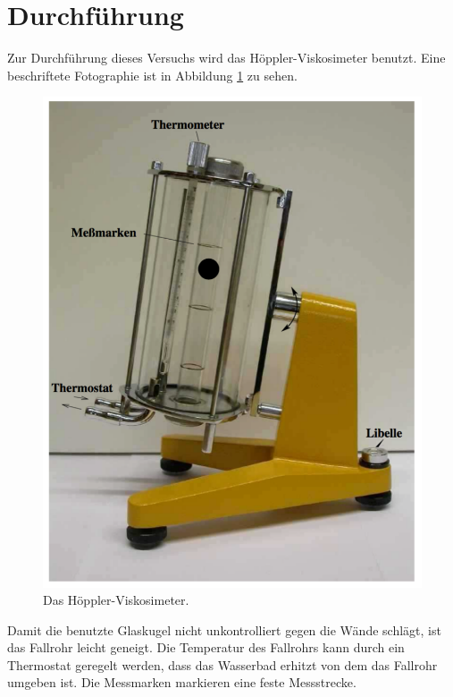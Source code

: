  \section{Durchführung}
\label{sec:Durchführung}

Zur Durchführung dieses Versuchs wird das Höppler-Viskosimeter benutzt.
Eine beschriftete Fotographie ist in Abbildung \ref{fig:hoeppvisko}
zu sehen.

\begin{figure}[h]
  \centering
  \includegraphics[height = 10 cm]{hoepplervisko.pdf}
  \caption{Das Höppler-Viskosimeter\cite{anleitung}.}
  \label{fig:hoeppvisko}
\end{figure}

Damit die benutzte Glaskugel nicht unkontrolliert gegen die Wände schlägt,
ist das Fallrohr leicht geneigt. Die Temperatur des Fallrohrs kann durch ein
Thermostat geregelt werden, dass das Wasserbad erhitzt von dem das Fallrohr
umgeben ist. Die Messmarken markieren eine feste Messstrecke.

